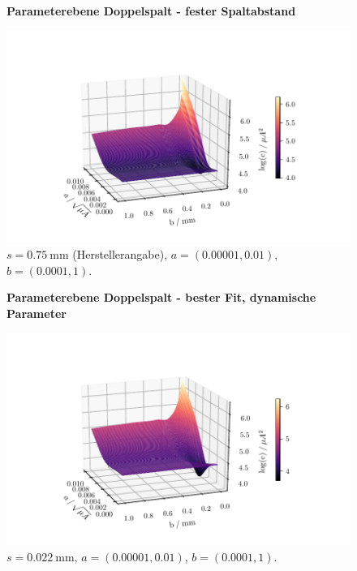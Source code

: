 \begin{figure}
    \centering
    \textbf{Parameterebene Doppelspalt - fester Spaltabstand}\par\medskip
    \includegraphics[width=.9\textwidth]{python/leastSquaresDoppel2ss.pdf}
    \caption{$s = \SI{0.75}{\milli\meter}$ (Herstellerangabe), $a = (0.00001, 0.01)$, $b = (0.0001, 1)$.}
    \label{fig:lsd2ss}
\end{figure}
\begin{figure}
    \centering
    \textbf{Parameterebene Doppelspalt - bester Fit, dynamische Parameter}\par\medskip
    \includegraphics[width=.9\textwidth]{python/leastSquaresDoppel2s.pdf}
    \caption{$s = \SI{0.022}{\milli\meter}$, $a = (0.00001, 0.01)$, $b = (0.0001, 1)$.}
    \label{fig:lsd2s}
\end{figure}

